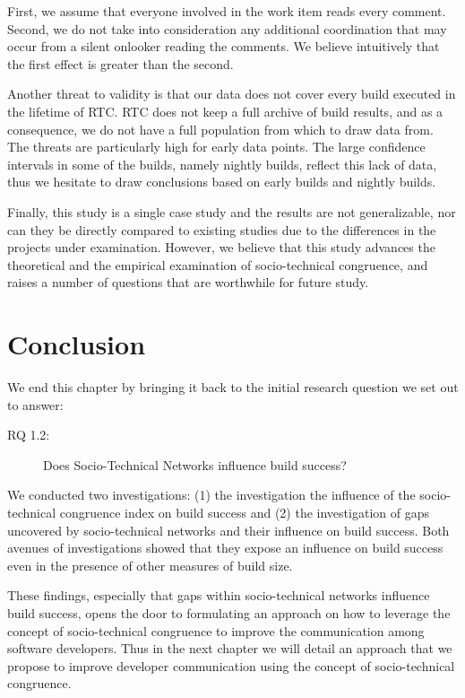 First, we assume that everyone involved in the work item reads every comment. Second, we do not take into consideration any additional coordination that may occur from a silent onlooker reading the comments. We believe intuitively that the first effect is greater than the second.

Another threat to validity is that our data does not cover every build executed in the lifetime of RTC. RTC does not keep a full archive of build results, and as a consequence, we do not have a full population from which to draw data from. The threats are particularly high for early data points. The large confidence intervals in some of the builds, namely nightly builds, reflect this lack of data, thus we hesitate to draw conclusions based on early builds and nightly builds.

Finally, this study is a single case study and the results are not generalizable, nor can they be directly compared to existing studies due to the differences in the projects under examination. However, we believe that this study advances the theoretical and the empirical examination of socio-technical congruence, and raises a number of questions that are worthwhile for future study.


\section{Conclusion}
\label{sec:conclusion}
We end this chapter by bringing it back to the initial research question we set out to answer:
\begin{description}
  \item[RQ 1.2:] Does Socio-Technical Networks influence build success?
\end{description}

We conducted two investigations: (1) the investigation the influence of the socio-technical congruence index on build success and (2) the investigation of gaps uncovered by socio-technical networks and their influence on build success.
Both avenues of investigations showed that they expose an influence on build success even in the presence of other measures of build size.

These findings, especially that gaps within socio-technical networks influence build success, opens the door to formulating an approach on how to leverage the concept of socio-technical congruence to improve the communication among software developers.
Thus in the next chapter we will detail an approach that we propose to improve developer communication using the concept of socio-technical congruence.
